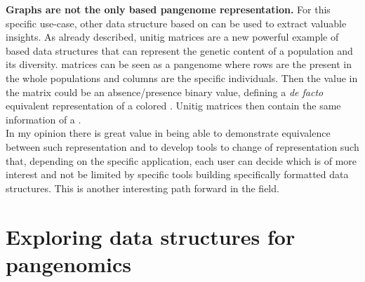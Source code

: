 \textbf{Graphs are not the only \kmer based pangenome representation.}
For this specific use-case, other data structure based on \kmers can be used to extract valuable insights. 
As already described, unitig matrices are a new powerful example of \kmer based data structures that can represent the genetic content of a population and its diversity. 
\kmer matrices \cite{kmtricks} can be seen as a pangenome where rows are the \kmers present in the whole populations and columns are the specific individuals. Then the value in the matrix could be an absence/presence binary value, defining a \emph{de fac{\tiny }to} equivalent representation of a colored \dbg. Unitig matrices then contain the same information of a \ccdbg. \\
In my opinion there is great value in being able to demonstrate equivalence between such representation and to develop tools to change of representation such that, depending on the specific application, each user can decide which is of more interest and not be limited by specific tools building specifically formatted data structures. This is another interesting path forward in the field.

\section{Exploring \kmer data structures for pangenomics}